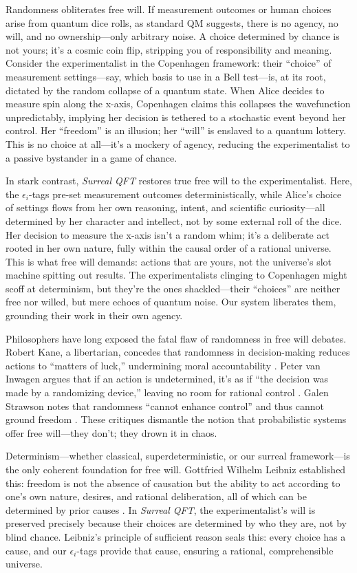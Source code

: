 \documentclass{article}
\begin{document}
Randomness obliterates free will. If measurement outcomes or human choices arise from quantum dice rolls, as standard QM suggests, there is no agency, no will, and no ownership---only arbitrary noise. A choice determined by chance is not yours; it's a cosmic coin flip, stripping you of responsibility and meaning. Consider the experimentalist in the Copenhagen framework: their ``choice'' of measurement settings---say, which basis to use in a Bell test---is, at its root, dictated by the random collapse of a quantum state. When Alice decides to measure spin along the x-axis, Copenhagen claims this collapses the wavefunction unpredictably, implying her decision is tethered to a stochastic event beyond her control. Her ``freedom'' is an illusion; her ``will'' is enslaved to a quantum lottery. This is no choice at all---it's a mockery of agency, reducing the experimentalist to a passive bystander in a game of chance.

In stark contrast, \textit{Surreal QFT} restores true free will to the experimentalist. Here, the \(\epsilon_i\)-tags pre-set measurement outcomes deterministically, while Alice's choice of settings flows from her own reasoning, intent, and scientific curiosity---all determined by her character and intellect, not by some external roll of the dice. Her decision to measure the x-axis isn't a random whim; it's a deliberate act rooted in her own nature, fully within the causal order of a rational universe. This is what free will demands: actions that are yours, not the universe's slot machine spitting out results. The experimentalists clinging to Copenhagen might scoff at determinism, but they're the ones shackled---their ``choices'' are neither free nor willed, but mere echoes of quantum noise. Our system liberates them, grounding their work in their own agency.

Philosophers have long exposed the fatal flaw of randomness in free will debates. Robert Kane, a libertarian, concedes that randomness in decision-making reduces actions to ``matters of luck,'' undermining moral accountability \cite{Kane1996}. Peter van Inwagen argues that if an action is undetermined, it's as if ``the decision was made by a randomizing device,'' leaving no room for rational control \cite{vanInwagen1983}. Galen Strawson notes that randomness ``cannot enhance control'' and thus cannot ground freedom \cite{Strawson1994}. These critiques dismantle the notion that probabilistic systems offer free will---they don't; they drown it in chaos.

Determinism---whether classical, superdeterministic, or our surreal framework---is the only coherent foundation for free will. Gottfried Wilhelm Leibniz established this: freedom is not the absence of causation but the ability to act according to one's own nature, desires, and rational deliberation, all of which can be determined by prior causes \cite{Leibniz1686}. In \textit{Surreal QFT}, the experimentalist's will is preserved precisely because their choices are determined by who they are, not by blind chance. Leibniz's principle of sufficient reason seals this: every choice has a cause, and our \(\epsilon_i\)-tags provide that cause, ensuring a rational, comprehensible universe.
\end{document}

